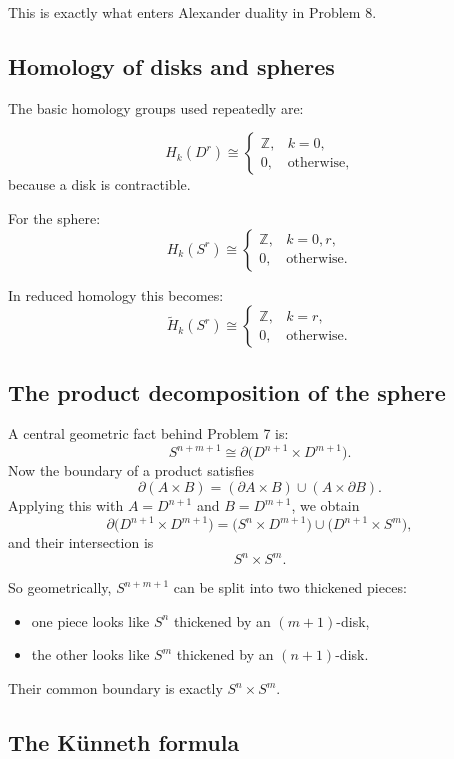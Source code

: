 \documentclass[12pt,a4paper]{article}
\theoremstyle{notespace}
\begin{document}
This is exactly what enters Alexander duality in Problem 8.

\subsection{Homology of disks and spheres}

The basic homology groups used repeatedly are:

\[
H_k(D^r)\cong
\begin{cases}
	\mathbb Z, & k=0,\\
	0, & \text{otherwise},
\end{cases}
\]
because a disk is contractible.

For the sphere:
\[
H_k(S^r)\cong
\begin{cases}
	\mathbb Z, & k=0,r,\\
	0, & \text{otherwise}.
\end{cases}
\]

In reduced homology this becomes:
\[
\widetilde H_k(S^r)\cong
\begin{cases}
	\mathbb Z, & k=r,\\
	0, & \text{otherwise}.
\end{cases}
\]

\subsection{The product decomposition of the sphere}

A central geometric fact behind Problem 7 is:
\[
S^{n+m+1}\cong \partial\bigl(D^{n+1}\times D^{m+1}\bigr).
\]
Now the boundary of a product satisfies
\[
\partial(A\times B)= (\partial A\times B)\cup (A\times \partial B).
\]
Applying this with \(A=D^{n+1}\) and \(B=D^{m+1}\), we obtain
\[
\partial\bigl(D^{n+1}\times D^{m+1}\bigr)
=
\bigl(S^n\times D^{m+1}\bigr)\cup \bigl(D^{n+1}\times S^m\bigr),
\]
and their intersection is
\[
S^n\times S^m.
\]

So geometrically, \(S^{n+m+1}\) can be split into two thickened pieces:
\begin{itemize}
	\item one piece looks like \(S^n\) thickened by an \((m+1)\)-disk,
	\item the other looks like \(S^m\) thickened by an \((n+1)\)-disk.
\end{itemize}

Their common boundary is exactly \(S^n\times S^m\).

\subsection{The K\"unneth formula}
\end{document}
